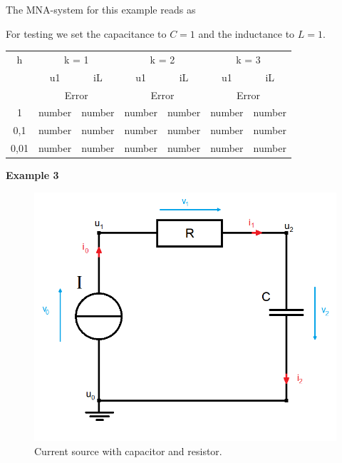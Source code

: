 	The MNA-system for this example reads as
	
	For testing we set the capacitance to $C=1$ and the inductance to $L=1$.
	
	\begin{center}
		\begin{tabular}{ c || c c | c c | c c | } 
			h & \multicolumn{2}{c|}{k = 1} & \multicolumn{2}{c|}{k = 2} & \multicolumn{2}{c|}{k = 3} \\
			& u1 & iL & u1 & iL & u1 & iL \\
			\hline
			& \multicolumn{2}{c|}{Error} & \multicolumn{2}{c|}{Error} & \multicolumn{2}{c|}{Error} \\
			\hline
			1 & number & number & number & number & number & number \\
			0,1 & number & number & number & number & number & number \\
			0,01 & number & number & number & number & number & number
		\end{tabular}
	\end{center}


	\textbf{Example 3} \\
	
	\begin{figure}[H]
		\centering
		\includegraphics[scale=0.4]{pictures/Example3.png}
		\caption{Current source with capacitor and resistor.}
	\end{figure}
	
